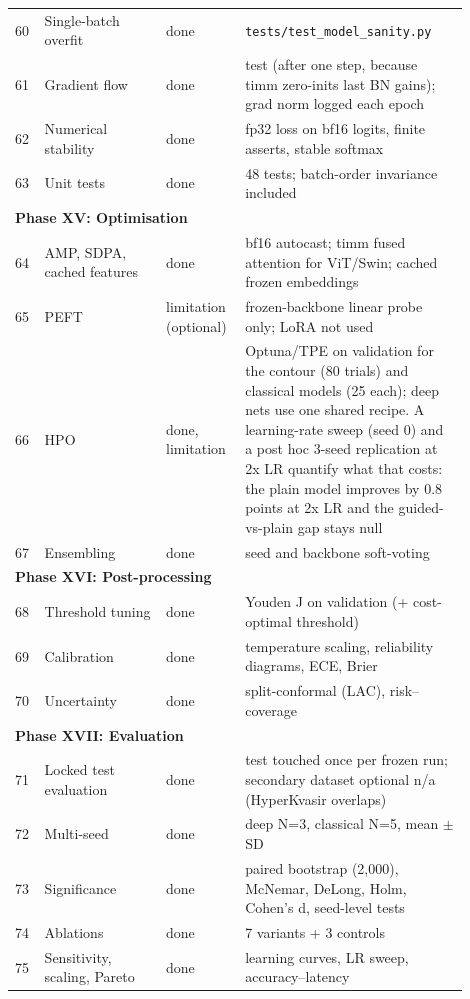 \begin{longtable}{p{0.05\linewidth}p{0.25\linewidth}p{0.14\linewidth}p{0.46\linewidth}}
60 & Single-batch overfit & done & \texttt{tests/test\_model\_sanity.py} \\
61 & Gradient flow & done & test (after one step, because timm zero-inits last BN gains); grad norm logged each epoch \\
62 & Numerical stability & done & fp32 loss on bf16 logits, finite asserts, stable softmax \\
63 & Unit tests & done & 48 tests; batch-order invariance included \\
\midrule\multicolumn{4}{l}{\textbf{Phase XV: Optimisation}}\\\midrule
64 & AMP, SDPA, cached features & done & bf16 autocast; timm fused attention for ViT/Swin; cached frozen embeddings \\
65 & PEFT & limitation (optional) & frozen-backbone linear probe only; LoRA not used \\
66 & HPO & done, limitation & Optuna/TPE on validation for the contour (80 trials) and classical models (25 each); deep nets use one shared recipe. A learning-rate sweep (seed 0) and a post hoc 3-seed replication at 2x LR quantify what that costs: the plain model improves by 0.8 points at 2x LR and the guided-vs-plain gap stays null \\
67 & Ensembling & done & seed and backbone soft-voting \\
\midrule\multicolumn{4}{l}{\textbf{Phase XVI: Post-processing}}\\\midrule
68 & Threshold tuning & done & Youden J on validation (+ cost-optimal threshold) \\
69 & Calibration & done & temperature scaling, reliability diagrams, ECE, Brier \\
70 & Uncertainty & done & split-conformal (LAC), risk--coverage \\
\midrule\multicolumn{4}{l}{\textbf{Phase XVII: Evaluation}}\\\midrule
71 & Locked test evaluation & done & test touched once per frozen run; secondary dataset optional n/a (HyperKvasir overlaps) \\
72 & Multi-seed & done & deep N=3, classical N=5, mean \ensuremath{\pm} SD \\
73 & Significance & done & paired bootstrap (2,000), McNemar, DeLong, Holm, Cohen's d, seed-level tests \\
74 & Ablations & done & 7 variants + 3 controls \\
75 & Sensitivity, scaling, Pareto & done & learning curves, LR sweep, accuracy--latency \\

\end{longtable}
